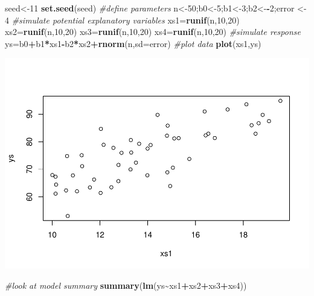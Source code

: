 \documentclass[
]{book}
\newenvironment{Shaded}{\begin{snugshade}}{\end{snugshade}}
\newcommand{\AttributeTok}[1]{\textcolor[rgb]{0.13,0.29,0.53}{#1}}
\newcommand{\CommentTok}[1]{\textcolor[rgb]{0.56,0.35,0.01}{\textit{#1}}}
\newcommand{\DecValTok}[1]{\textcolor[rgb]{0.00,0.00,0.81}{#1}}
\newcommand{\FunctionTok}[1]{\textcolor[rgb]{0.13,0.29,0.53}{\textbf{#1}}}
\newcommand{\NormalTok}[1]{#1}
\newcommand{\OtherTok}[1]{\textcolor[rgb]{0.56,0.35,0.01}{#1}}
\newcommand{\SpecialCharTok}[1]{\textcolor[rgb]{0.81,0.36,0.00}{\textbf{#1}}}
\begin{document}
\begin{Shaded}
\begin{Highlighting}[]
\NormalTok{seed}\OtherTok{\textless{}{-}}\DecValTok{11}
\FunctionTok{set.seed}\NormalTok{(seed)}
\CommentTok{\#define parameters}
\NormalTok{n}\OtherTok{\textless{}{-}}\DecValTok{50}\NormalTok{;b0}\OtherTok{\textless{}{-}}\DecValTok{5}\NormalTok{;b1}\OtherTok{\textless{}{-}}\DecValTok{3}\NormalTok{;b2}\OtherTok{\textless{}{-}}\SpecialCharTok{{-}}\DecValTok{2}\NormalTok{;error }\OtherTok{\textless{}{-}} \DecValTok{4}
\CommentTok{\#simulate potential explanatory variables}
\NormalTok{xs1}\OtherTok{=}\FunctionTok{runif}\NormalTok{(n,}\DecValTok{10}\NormalTok{,}\DecValTok{20}\NormalTok{)}
\NormalTok{xs2}\OtherTok{=}\FunctionTok{runif}\NormalTok{(n,}\DecValTok{10}\NormalTok{,}\DecValTok{20}\NormalTok{)}
\NormalTok{xs3}\OtherTok{=}\FunctionTok{runif}\NormalTok{(n,}\DecValTok{10}\NormalTok{,}\DecValTok{20}\NormalTok{)}
\NormalTok{xs4}\OtherTok{=}\FunctionTok{runif}\NormalTok{(n,}\DecValTok{10}\NormalTok{,}\DecValTok{20}\NormalTok{)}
\CommentTok{\#simulate response}
\NormalTok{ys}\OtherTok{=}\NormalTok{b0}\SpecialCharTok{+}\NormalTok{b1}\SpecialCharTok{*}\NormalTok{xs1}\SpecialCharTok{{-}}\NormalTok{b2}\SpecialCharTok{*}\NormalTok{xs2}\SpecialCharTok{+}\FunctionTok{rnorm}\NormalTok{(n,}\AttributeTok{sd=}\NormalTok{error)}
\CommentTok{\#plot data}
\FunctionTok{plot}\NormalTok{(xs1,ys)}
\end{Highlighting}
\end{Shaded}

\includegraphics{ECOMODbook_files/figure-latex/a7.4-1.pdf}

\begin{Shaded}
\begin{Highlighting}[]
\CommentTok{\#look at model summary}
\FunctionTok{summary}\NormalTok{(}\FunctionTok{lm}\NormalTok{(ys}\SpecialCharTok{\textasciitilde{}}\NormalTok{xs1}\SpecialCharTok{+}\NormalTok{xs2}\SpecialCharTok{+}\NormalTok{xs3}\SpecialCharTok{+}\NormalTok{xs4))}
\end{Highlighting}
\end{Shaded}
\end{document}
